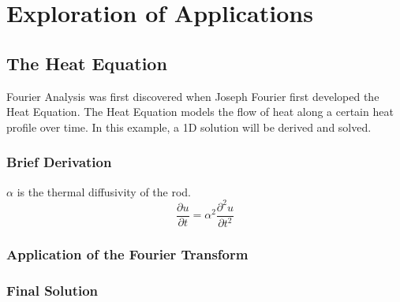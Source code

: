 \section{Exploration of Applications}
\subsection{The Heat Equation}
Fourier Analysis was first discovered when Joseph Fourier first developed the Heat Equation. The Heat Equation models the flow of heat along a certain heat profile over time. In this example, a 1D solution will be derived and solved.

\subsubsection{Brief Derivation}
\(\alpha\) is the thermal diffusivity of the rod.
\[ \frac{\partial u}{\partial t} = \alpha^2 \frac{\partial^2 u}{\partial t^2} \]

\subsubsection{Application of the Fourier Transform}

\subsubsection{Final Solution}
